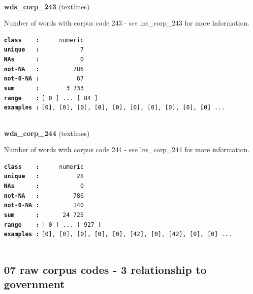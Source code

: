 \documentclass[]{article}
\begin{document}
~

\textbf{wds\_corp\_243} (textlines)

Number of words with corpus code 243 - see lns\_corp\_243 for more
information.

\textbf{\texttt{class\ \ \ \ :}} \texttt{~~~~~numeric}\\
\textbf{\texttt{unique\ \ \ :}} \texttt{~~~~~~~~~~~7}\\
\textbf{\texttt{NAs\ \ \ \ \ \ :}} \texttt{~~~~~~~~~~~0}\\
\textbf{\texttt{not-NA\ \ \ :}} \texttt{~~~~~~~~~786}\\
\textbf{\texttt{not-0-NA\ :}} \texttt{~~~~~~~~~~67}\\
\textbf{\texttt{sum\ \ \ \ \ \ :}} \texttt{~~~~~~~3~733}\\
\textbf{\texttt{range\ \ \ \ :}}
\texttt{{[}\ 0\ {]}\ ...\ {[}\ 84\ {]}}\\
\textbf{\texttt{examples\ :}}
\texttt{{[}0{]},\ {[}0{]},\ {[}0{]},\ {[}0{]},\ {[}0{]},\ {[}0{]},\ {[}0{]},\ {[}0{]},\ {[}0{]},\ {[}0{]}\ ...}\\

~

\textbf{wds\_corp\_244} (textlines)

Number of words with corpus code 244 - see lns\_corp\_244 for more
information.

\textbf{\texttt{class\ \ \ \ :}} \texttt{~~~~~numeric}\\
\textbf{\texttt{unique\ \ \ :}} \texttt{~~~~~~~~~~28}\\
\textbf{\texttt{NAs\ \ \ \ \ \ :}} \texttt{~~~~~~~~~~~0}\\
\textbf{\texttt{not-NA\ \ \ :}} \texttt{~~~~~~~~~786}\\
\textbf{\texttt{not-0-NA\ :}} \texttt{~~~~~~~~~140}\\
\textbf{\texttt{sum\ \ \ \ \ \ :}} \texttt{~~~~~~24~725}\\
\textbf{\texttt{range\ \ \ \ :}}
\texttt{{[}\ 0\ {]}\ ...\ {[}\ 927\ {]}}\\
\textbf{\texttt{examples\ :}}
\texttt{{[}0{]},\ {[}0{]},\ {[}0{]},\ {[}0{]},\ {[}0{]},\ {[}42{]},\ {[}0{]},\ {[}42{]},\ {[}0{]},\ {[}0{]}\ ...}\\

~

\subsection{07 raw corpus codes - 3 relationship to
government}\label{raw-corpus-codes---3-relationship-to-government}
\end{document}
